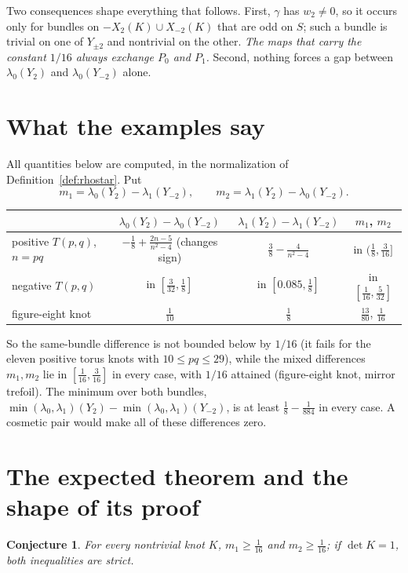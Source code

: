 \documentclass[10pt]{amsart}
\numberwithin{equation}{section}
\theoremstyle{compact}
\newtheorem{conjecture}[theorem]{Conjecture}
\theoremstyle{definition}
\begin{document}
Two consequences shape everything that follows. First, $\gamma$ has
$w_2\neq0$, so it occurs only for bundles on
$-X_2(K)\cup X_{-2}(K)$ that are odd on $S$; such a bundle is trivial on
one of $Y_{\pm2}$ and nontrivial on the other. \emph{The maps that carry the
constant $1/16$ always exchange $P_0$ and $P_1$.} Second, nothing forces
a gap between $\lambda_0(Y_2)$ and $\lambda_0(Y_{-2})$ alone.

\section{What the examples say}

All quantities below are computed, in the normalization of
Definition~\ref{def:rhostar}. Put
\[
m_1=\lambda_0(Y_2)-\lambda_1(Y_{-2}),\qquad
m_2=\lambda_1(Y_2)-\lambda_0(Y_{-2}).
\]

\begin{center}\small
\begin{tabular}{lccc}
& $\lambda_0(Y_2)-\lambda_0(Y_{-2})$ & $\lambda_1(Y_2)-\lambda_1(Y_{-2})$ & $m_1$, $m_2$\\\hline
positive $T(p,q)$, $n=pq$ & $-\frac18+\frac{2n-5}{n^2-4}$ (changes sign) & $\frac38-\frac4{n^2-4}$ & in $(\frac18,\frac3{16}]$\\
negative $T(p,q)$ & in $[\frac3{32},\frac18]$ & in $[0.085,\frac18]$ & in $[\frac1{16},\frac5{32}]$\\
figure-eight knot & $\frac1{10}$ & $\frac18$ & $\frac{13}{80}$, $\frac1{16}$
\end{tabular}
\end{center}

So the same-bundle difference is not bounded below by $1/16$ (it fails for
the eleven positive torus knots with $10\le pq\le29$), while the mixed
differences $m_1,m_2$ lie in $[\frac1{16},\frac3{16}]$ in every case, with
$1/16$ attained (figure-eight knot, mirror trefoil). The minimum over both
bundles, $\min(\lambda_0,\lambda_1)(Y_2)-\min(\lambda_0,\lambda_1)(Y_{-2})$,
is at least $\frac18-\frac1{884}$ in every case. A cosmetic pair would make
all of these differences zero.

\section{The expected theorem and the shape of its proof}

\begin{conjecture}\label{conj:main}
For every nontrivial knot $K$, $m_1\ge\frac1{16}$ and $m_2\ge\frac1{16}$;
if $\det K=1$, both inequalities are strict.
\end{conjecture}
\end{document}
